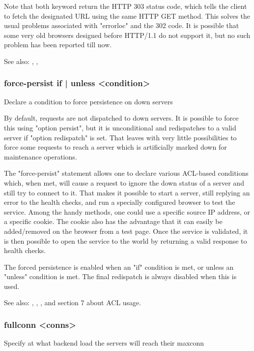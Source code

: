   Note that both keyword return the HTTP 303 status code, which tells the
  client to fetch the designated URL using the same HTTP GET method. This
  solves the usual problems associated with "errorloc" and the 302 code. It is
  possible that some very old browsers designed before HTTP/1.1 do not support
  it, but no such problem has been reported till now.

  See also: , , 

\subsubsection[force-persist]{force-persist { if | unless } <condition>}
  Declare a condition to force persistence on down servers
  

  By default, requests are not dispatched to down servers. It is possible to
  force this using "option persist", but it is unconditional and redispatches
  to a valid server if "option redispatch" is set. That leaves with very little
  possibilities to force some requests to reach a server which is artificially
  marked down for maintenance operations.

  The "force-persist" statement allows one to declare various ACL-based
  conditions which, when met, will cause a request to ignore the down status of
  a server and still try to connect to it. That makes it possible to start a
  server, still replying an error to the health checks, and run a specially
  configured browser to test the service. Among the handy methods, one could
  use a specific source IP address, or a specific cookie. The cookie also has
  the advantage that it can easily be added/removed on the browser from a test
  page. Once the service is validated, it is then possible to open the service
  to the world by returning a valid response to health checks.

  The forced persistence is enabled when an "if" condition is met, or unless an
  "unless" condition is met. The final redispatch is always disabled when this
  is used.

  See also: , , ,
             and section 7 about ACL usage.

\subsubsection[fullconn]{fullconn <conns>}
  Specify at what backend load the servers will reach their maxconn
  
